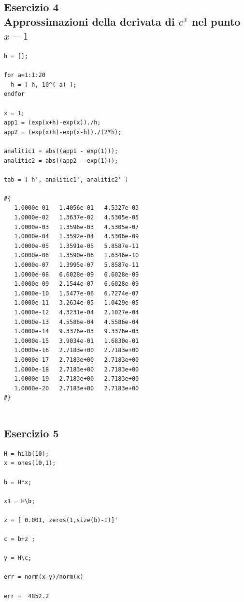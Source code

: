 \documentclass{article}
\begin{document}
\newpage
\subsection{ Esercizio 4 \\ Approssimazioni della derivata di $e^x$ nel punto $x=1$}
\begin{lstlisting}
h = [];

for a=1:1:20
  h = [ h, 10^(-a) ];
endfor

x = 1;
app1 = (exp(x+h)-exp(x))./h;
app2 = (exp(x+h)-exp(x-h))./(2*h);

analitic1 = abs((app1 - exp(1)));
analitic2 = abs((app2 - exp(1)));

tab = [ h', analitic1', analitic2' ]

#{
   1.0000e-01   1.4056e-01   4.5327e-03
   1.0000e-02   1.3637e-02   4.5305e-05
   1.0000e-03   1.3596e-03   4.5305e-07
   1.0000e-04   1.3592e-04   4.5306e-09
   1.0000e-05   1.3591e-05   5.8587e-11
   1.0000e-06   1.3590e-06   1.6346e-10
   1.0000e-07   1.3995e-07   5.8587e-11
   1.0000e-08   6.6028e-09   6.6028e-09
   1.0000e-09   2.1544e-07   6.6028e-09
   1.0000e-10   1.5477e-06   6.7274e-07
   1.0000e-11   3.2634e-05   1.0429e-05
   1.0000e-12   4.3231e-04   2.1027e-04
   1.0000e-13   4.5586e-04   4.5586e-04
   1.0000e-14   9.3376e-03   9.3376e-03
   1.0000e-15   3.9034e-01   1.6830e-01
   1.0000e-16   2.7183e+00   2.7183e+00
   1.0000e-17   2.7183e+00   2.7183e+00
   1.0000e-18   2.7183e+00   2.7183e+00
   1.0000e-19   2.7183e+00   2.7183e+00
   1.0000e-20   2.7183e+00   2.7183e+00
#}


\end{lstlisting}


\newpage
\subsection{ Esercizio 5}
\begin{lstlisting}
H = hilb(10);
x = ones(10,1);

b = H*x;

x1 = H\b;

z = [ 0.001, zeros(1,size(b)-1)]'

c = b+z ;

y = H\c;

err = norm(x-y)/norm(x)

err =  4852.2

\end{lstlisting}
\end{document}
